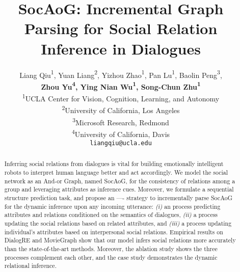 \documentclass[11pt,a4paper]{article}
\title{SocAoG: Incremental Graph Parsing for Social Relation Inference in Dialogues}
\author{Liang Qiu{\normalfont\textsuperscript{1}}, Yuan Liang{\normalfont\textsuperscript{2}}, Yizhou Zhao{\normalfont\textsuperscript{1}}, Pan Lu{\normalfont\textsuperscript{1}}, Baolin Peng{\normalfont\textsuperscript{3}}, \\
{\bf Zhou Yu{\normalfont\textsuperscript{4}}, Ying Nian Wu{\normalfont\textsuperscript{1}}, Song-Chun Zhu{\normalfont\textsuperscript{1}}} \\
\textsuperscript{1}UCLA Center for Vision, Cognition, Learning, and Autonomy \\
\textsuperscript{2}University of California, Los Angeles \\
\textsuperscript{3}Microsoft Research, Redmond \\
\textsuperscript{4}University of California, Davis \\
\texttt{liangqiu@ucla.edu}
}
\date{}
\begin{document}
\maketitle
\begin{abstract}
Inferring social relations from dialogues is vital for building emotionally intelligent robots to interpret human language better and act accordingly. We model the social network as an And-or Graph, named SocAoG, for the consistency of relations among a group and leveraging attributes as inference cues. Moreover, we formulate a sequential structure prediction task, and propose an ---- strategy to incrementally parse SocAoG for the dynamic inference upon any incoming utterance:  \textit{(i)} an  process predicting attributes and relations conditioned on the semantics of dialogues, \textit{(ii)} a  process updating the social relations based on related attributes, and \textit{(iii)} a  process updating individual's attributes based on interpersonal social relations. Empirical results on DialogRE and MovieGraph show that our model infers social relations more accurately than the state-of-the-art methods. Moreover, the ablation study shows the three processes complement each other, and the case study demonstrates the dynamic relational inference.
\end{abstract}
\end{document}
